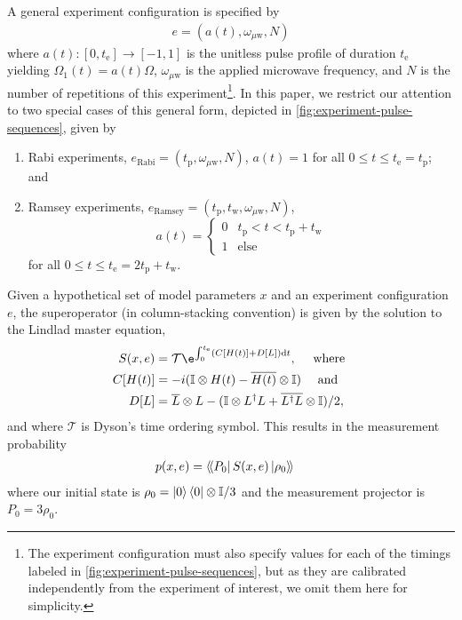 \documentclass[aps,nofootinbib,twocolumn,superscriptaddress]{revtex4}
\newcommand{\mps}{x}
\newcommand{\eps}{e}
\newcommand{\Rabi}{\text{Rabi}}
\newcommand{\Ramsey}{\text{Ramsey}}
\newcommand{\te}{t_\text{e}}
\newcommand{\tp}{t_\text{p}}
\newcommand{\tw}{t_\text{w}}
\renewcommand{\H}{H}    %
\renewcommand{\L}{L}    %
\renewcommand{\S}{S}    %
\newcommand{\uw}{{\mu\text{w}}}
\begin{document}
A general experiment configuration is specified by
\begin{align}
    \eps=(a(t), \omega_\uw, N)
\end{align}
where $a(t):[0,\te]\rightarrow [-1,1]$ is the
unitless pulse profile of duration $\te$
yielding $\Omega_1(t)=a(t)\Omega$,
$\omega_\uw$ is the applied microwave frequency,
and $N$ is the number of repetitions of this experiment\footnote{The
experiment configuration must also specify values for each of the timings
labeled in \autoref{fig:experiment-pulse-sequences}, but as they are
calibrated independently from the experiment of interest, we omit
them here for simplicity.}.
In this paper, we restrict our attention to two special
cases of this general form, depicted in
\autoref{fig:experiment-pulse-sequences}, given by
\begin{enumerate}
    \item Rabi experiments, $\eps_\Rabi=(\tp,\omega_\uw, N)$,
    $a(t)=1$ for all $0\leq t\leq \te=\tp$; and
    \item Ramsey experiments, $\eps_\Ramsey=(\tp,\tw,\omega_\uw, N)$,
    \begin{equation*}
        a(t)=\begin{cases}
            0 & \tp<t<\tp+\tw\\
            1 & \text{else}
        \end{cases}
    \end{equation*}
    for all $0\leq t\leq \te=2\tp+\tw$.
\end{enumerate}

Given a hypothetical set of model parameters $\mps$ and
an experiment configuration $\eps$, the superoperator
(in column-stacking convention) is given by the solution
to the Lindlad master equation,
\begin{subequations}
\begin{align}
    S(\mps,\eps)
        &=\mathcal{T}\e^{\int_0^{\te}(C[\H(t)]+D[\L])\dd t},
        \quad\text{ where } \\
    C[\H(t)]
        &=-i(\I\otimes\H(t)-\overline{\H(t)}\otimes\I)
        \quad\text{ and } \\
    D[L]
        &= \overline{L}\otimes L
            -(\I\otimes L^\dagger L + \overline{L^\dagger L}\otimes \I) / 2,
\end{align}
\end{subequations}
and where $\mathcal{T}$ is Dyson's time ordering symbol.
This results in the measurement probability
\begin{align}
    p(\mps,\eps)
        &=  \dbra{P_0} \S(\mps,\eps)\dket{\rho_0}
    \label{eq:born-rule}
\end{align}
where our initial state is $\rho_0=\ket{0}\bra{0}\otimes\mathbb{I}/3$
and the measurement projector is $P_0=3\rho_0$.
\end{document}
